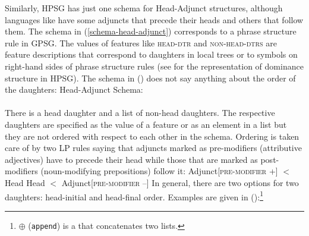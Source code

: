 \documentclass[output=paper,biblatex,babelshorthands,newtxmath,draftmode,colorlinks,citecolor=brown]{langscibook}
\begin{document}
Similarly, HPSG has just one schema for Head-Adjunct structures, although languages like
 have some adjuncts that precede their heads and others that follow them. The schema in
(\ref{schema-head-adjunct}) corresponds to a phrase structure rule in GPSG. The values of features
like \textsc{head-dtr} and \textsc{non-head-dtrs} are feature descriptions that correspond to
daughters in local trees or to symbols on right-hand sides of phrase structure rules (see
\crossrefchapteralt[\page \pageref{prop:sec-elements}]{properties} for the representation of
dominance structure in HPSG). The schema in () does not say anything about the order of the
daughters: 
\largerpage
\ea
Head-Adjunct Schema:\\
\label{schema-head-adjunct}
 \impl\\
\z
There is a head daughter and a list of non-head daughters. The respective daughters are specified as
the value of a feature or as an element in a list but they are not ordered with respect to each
other in the schema. Ordering is taken care of by two LP rules saying that adjuncts marked
as pre-modifiers (\eg attributive adjectives) have to precede their head while those that are marked
as post-modifiers (noun-modifying prepositions) follow it:
\eal
\label{lp-pre-modifier}
\ex Adjunct[\textsc{pre-modifier} +] $<$ Head
\ex Head $<$ Adjunct[\textsc{pre-modifier} --]
\zl
In general, there are two options for two daughters: head-initial and head-final order. Examples are
given in ():\footnote{%
$\oplus$\is{$\oplus$} (\texttt{append}) is a  that concatenates two lists. 
}
\eal
\ex {}
\end{document}
